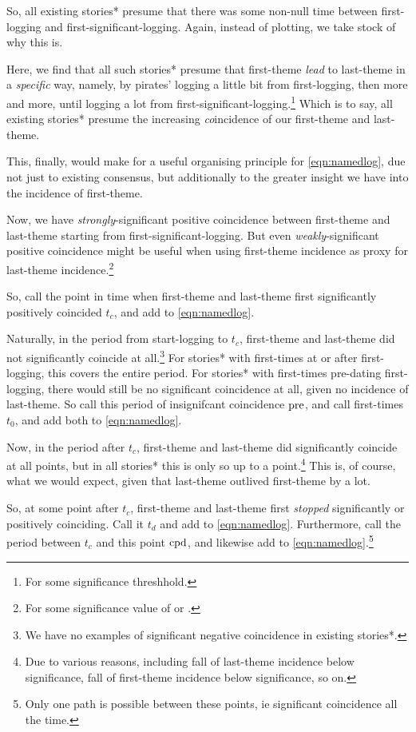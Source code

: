 			So, all existing stories* presume that there was some non-null time between first-logging and first-significant-logging. Again, instead of plotting, we take stock of why this is.
			
			Here, we find that all such stories* presume that first-theme \emph{lead} to last-theme in a \emph{specific} way, namely, by pirates' logging a little bit from first-logging, then more and more, until logging a lot from first-significant-logging.\footnote{For some significance threshhold.} Which is to say, all existing stories* presume the increasing \emph{co}incidence of our first-theme and last-theme.
			
			This, finally, would make for a useful organising principle for \ref{eqn:namedlog}, due not just to existing consensus, but additionally to the greater insight we have into the incidence of first-theme.
			
			Now, we have \emph{strongly}-significant positive coincidence between first-theme and last-theme starting from first-significant-logging. But even \emph{weakly}-significant positive coincidence might be useful when using first-theme incidence as proxy for last-theme incidence.\footnote{For some significance value of  or .}
			
			So, call the point in time when first-theme and last-theme first significantly positively coincided \(t_c\), and add to \ref{eqn:namedlog}.
			
			Naturally, in the period from start-logging to \(t_c\), first-theme and last-theme did not significantly coincide at all.\footnote{We have no examples of significant negative coincidence in existing stories*.} For stories* with first-times at or after first-logging, this covers the entire period. For stories* with first-times pre-dating first-logging, there would still be no significant coincidence at all, given no incidence of last-theme. So call this period of insignifcant coincidence \(\operatorname{pre}\), and call first-times \(t_0\), and add both to \ref{eqn:namedlog}.
			
			Now, in the period after \(t_c\), first-theme and last-theme did significantly coincide at all points, but in all stories* this is only so up to a point.\footnote{Due to various reasons, including fall of last-theme incidence below significance, fall of first-theme incidence below significance, so on.} This is, of course, what we would expect, given that last-theme outlived first-theme by a lot.
			
			So, at some point after \(t_c\), first-theme and last-theme first \emph{stopped} significantly or positively coinciding. Call it \(t_d\) and add to \ref{eqn:namedlog}. Furthermore, call the period between \(t_c\) and this point \(\operatorname{cpd}\), and likewise add to \ref{eqn:namedlog}.\footnote{Only one path is possible between these points, ie significant coincidence all the time.}
			

